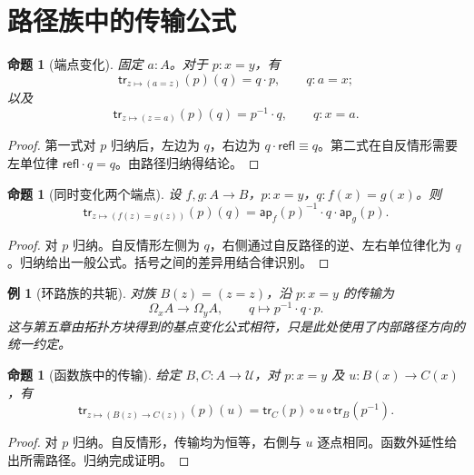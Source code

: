 \documentclass[12pt,oneside,openany,fontset=none]{ctexbook}
\theoremstyle{cn}
\newtheorem{example}[definition]{例}
\newtheorem{proposition}[definition]{命题}
\numberwithin{equation}{chapter}
\newcommand{\U}{\mathcal U}
\newcommand{\refl}{\mathsf{refl}}
\newcommand{\ap}{\mathsf{ap}}
\newcommand{\tr}{\mathsf{tr}}
\begin{document}
\section{路径族中的传输公式}
\begin{proposition}[端点变化]
固定 $a:A$。对于 $p:x=y$，有
\[
\tr_{z\mapsto(a=z)}(p)(q)=q\cdot p,
\qquad q:a=x;
\]
以及
\[
\tr_{z\mapsto(z=a)}(p)(q)=p^{-1}\cdot q,
\qquad q:x=a.
\]
\end{proposition}
\begin{proof}
第一式对 $p$ 归纳后，左边为 $q$，右边为 $q\cdot\refl\equiv q$。第二式在自反情形需要左单位律 $\refl\cdot q=q$。由路径归纳得结论。
\end{proof}
\begin{proposition}[同时变化两个端点]\label{prop:transport-equality}
设 $f,g:A\to B$，$p:x=y$，$q:f(x)=g(x)$。则
\[
\tr_{z\mapsto(f(z)=g(z))}(p)(q)
=\ap_f(p)^{-1}\cdot q\cdot\ap_g(p).
\]
\end{proposition}
\begin{proof}
对 $p$ 归纳。自反情形左侧为 $q$，右侧通过自反路径的逆、左右单位律化为 $q$。归纳给出一般公式。括号之间的差异用结合律识别。
\end{proof}
\begin{example}[环路族的共轭]
对族 $B(z)=(z=z)$，沿 $p:x=y$ 的传输为
\[
\Omega_xA\to\Omega_yA,
\qquad q\mapsto p^{-1}\cdot q\cdot p.
\]
这与第五章由拓扑方块得到的基点变化公式相符，只是此处使用了内部路径方向的统一约定。
\end{example}
\begin{proposition}[函数族中的传输]
给定 $B,C:A\to\U$，对 $p:x=y$ 及 $u:B(x)\to C(x)$，有
\[
\tr_{z\mapsto(B(z)\to C(z))}(p)(u)
=\tr_C(p)\circ u\circ\tr_B(p^{-1}).
\]
\end{proposition}
\begin{proof}
对 $p$ 归纳。自反情形，传输均为恒等，右側与 $u$ 逐点相同。函数外延性给出所需路径。归纳完成证明。
\end{proof}
\end{document}
